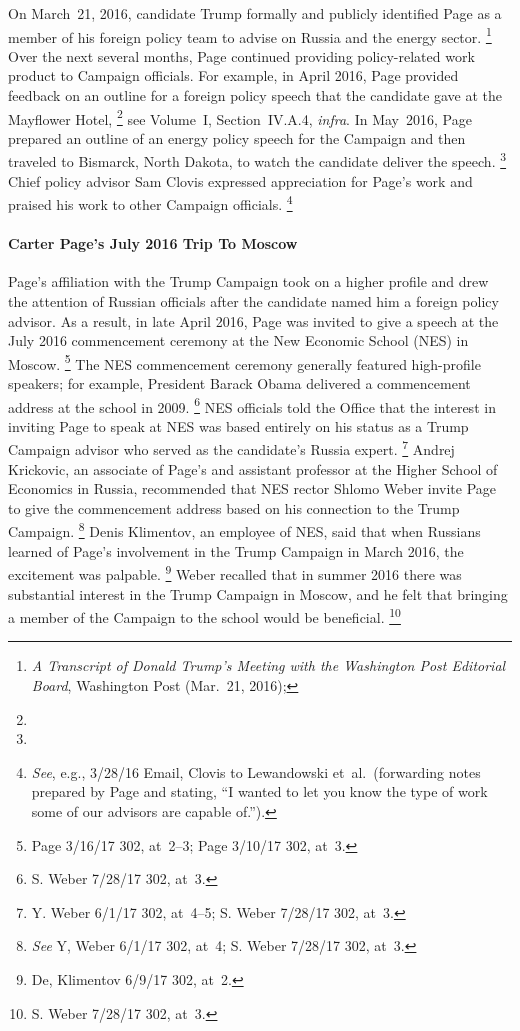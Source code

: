 On March~21, 2016, candidate Trump formally and publicly identified Page as a member of his foreign policy team to advise on Russia and the energy sector.%
\footnote{\textit{A Transcript of Donald Trump's Meeting with the Washington Post Editorial Board}, Washington Post (Mar.~21, 2016); }
Over the next several months, Page continued providing policy-related work product to Campaign officials.
For example, in April 2016, Page provided feedback on an outline for a foreign policy speech that the candidate gave at the Mayflower Hotel,%
\footnote{}
see Volume~I, Section~IV.A.4, \textit{infra}.
In May~2016, Page prepared an outline of an energy policy speech for the Campaign and then traveled to Bismarck, North Dakota, to watch the candidate deliver the speech.%
\footnote{}
Chief policy advisor Sam Clovis expressed appreciation for Page's work and praised his work to other Campaign officials.%
\footnote{\textit{See}, e.g., 3/28/16 Email, Clovis to Lewandowski et~al.\
(forwarding notes prepared by Page and stating, ``I wanted to let you know the type of work some of our advisors are capable of.'').}

\paragraph{Carter Page's July 2016 Trip To Moscow}

Page's affiliation with the Trump Campaign took on a higher profile and drew the attention of Russian officials after the candidate named him a foreign policy advisor.
As a result, in late April 2016, Page was invited to give a speech at the July 2016 commencement ceremony at the New Economic School (NES) in Moscow.%
\footnote{Page 3/16/17 302, at~2--3; Page 3/10/17 302, at~3.}
The NES commencement ceremony generally featured high-profile speakers; for example, President Barack Obama delivered a commencement address at the school in 2009.%
\footnote{S. Weber 7/28/17 302, at~3.}
NES officials told the Office that the interest in inviting Page to speak at NES was based entirely on his status as a Trump Campaign advisor who served as the candidate's Russia expert.%
\footnote{Y. Weber 6/1/17 302, at~4--5;
S. Weber 7/28/17 302, at~3.}
Andrej Krickovic, an associate of Page's and assistant professor at the Higher School of Economics in Russia, recommended that NES rector Shlomo Weber invite Page to give the commencement address based on his connection to the Trump Campaign.%
\footnote{\textit{See} Y, Weber 6/1/17 302, at~4;
S. Weber 7/28/17 302, at~3.}
Denis Klimentov, an employee of NES, said that when Russians learned of Page's involvement in the Trump Campaign in March 2016, the excitement was palpable.%
\footnote{De, Klimentov 6/9/17 302, at~2.}
Weber recalled that in summer 2016 there was substantial interest in the Trump Campaign in Moscow, and he felt that bringing a member of the Campaign to the school would be beneficial.%
\footnote{S. Weber 7/28/17 302, at~3.}

